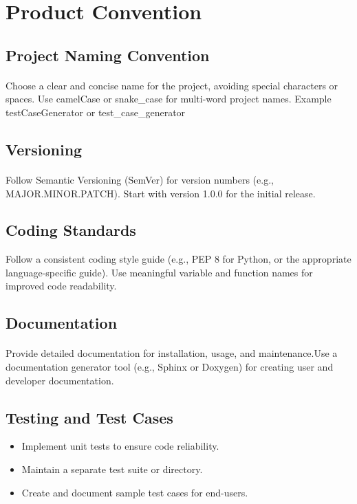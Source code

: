 \documentclass{article}
\begin{document}

\section{Product Convention}
\subsection{Project Naming Convention}
\paragraph{}
Choose a clear and concise name for the project, avoiding special characters or spaces.
Use camelCase or snake\_case for multi-word project names.
Example\: testCaseGenerator or test\_case\_generator

\subsection{Versioning}
\paragraph{}
Follow Semantic Versioning (SemVer) for version numbers (e.g., MAJOR.MINOR.PATCH).
Start with version 1.0.0 for the initial release.

\subsection{Coding Standards}
Follow a consistent coding style guide (e.g., PEP 8 for Python, or the appropriate
language-specific guide). Use meaningful variable and function names for improved
code readability.

\subsection{Documentation}
\paragraph{}
Provide detailed documentation for installation, usage, and maintenance.Use a
documentation generator tool (e.g., Sphinx or Doxygen) for creating user and developer
documentation.

\subsection{Testing and Test Cases}
\begin{itemize}
    \item Implement unit tests to ensure code reliability.
    \item Maintain a separate test suite or directory.
    \item Create and document sample test cases for end-users.
\end{itemize}
\end{document}
